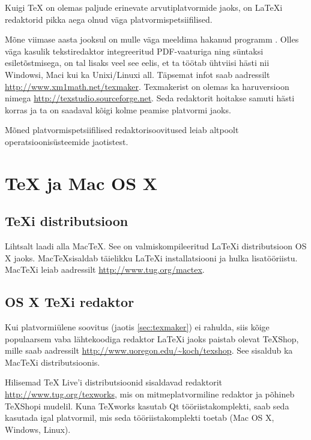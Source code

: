 Kuigi \TeX{} on olemas paljude erinevate arvutiplatvormide jaoks, on
\LaTeX i redaktorid pikka aega olnud väga platvormispetsiifilised.

Mõne viimase aasta jooksul on mulle väga meeldima hakanud programm
. Olles väga kasulik tekstiredaktor integreeritud
PDF-vaaturiga ning süntaksi esiletõstmisega, on tal lisaks veel see
eelis, et ta töötab ühtviisi hästi nii Windowsi, Maci kui ka
Unixi/Linuxi all. Täpsemat infot saab aadressilt
\url{http://www.xm1math.net/texmaker}. Texmakerist on olemas ka
haruversioon nimega 
\url{http://texstudio.sourceforge.net}. Seda redaktorit hoitakse samuti
hästi korras ja ta on saadaval kõigi kolme peamise platvormi jaoks.

Mõned platvormispetsiifilised redaktorisoovitused leiab altpoolt
operatsioonisüsteemide jaotistest.

\section{\TeX{} ja Mac OS X}

\subsection{\TeX i distributsioon}

Lihtsalt laadi alla Mac\TeX. See on
valmiskompileeritud \LaTeX i distributsioon OS X jaoks. Mac\TeX sisaldab
täielikku \LaTeX i installatsiooni ja hulka lisatööriistu. Mac\TeX i
leiab aadressilt \url{http://www.tug.org/mactex}.

\subsection{OS X \TeX i redaktor}

Kui platvormiülene soovitus  (jaotis \ref{sec:texmaker}) ei
rahulda, siis kõige populaarsem vaba lähtekoodiga redaktor \LaTeX i
jaoks paistab olevat TeX\-Shop, mille saab aadressilt
\url{http://www.uoregon.edu/~koch/texshop}. See sisaldub ka
Mac\TeX i distributsioonis.

Hilisemad \TeX{} Live'i distributsioonid
sisaldavad redaktorit  \url{http://www.tug.org/texworks},
mis on mitmeplatvormiline redaktor ja põhineb TeXShopi mudelil. Kuna
TeXworks kasutab Qt tööriistakomplekti, saab seda kasutada igal
platvormil, mis seda tööriistakomplekti toetab (Mac OS X, Windows,
Linux).

